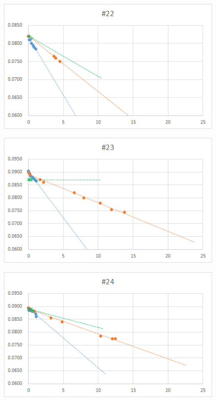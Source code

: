   \begin{figure}[htbp]
    \centering
       \includegraphics[width=120mm]{vol_022.png}
  \end{figure}
  \begin{figure}[htbp]
    \centering
       \includegraphics[width=120mm]{vol_023.png}
  \end{figure}
  \begin{figure}[htbp]
    \centering
       \includegraphics[width=120mm]{vol_024.png}
  \end{figure}
